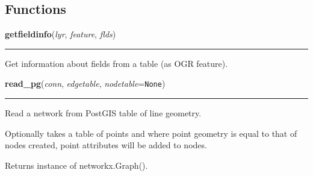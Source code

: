   \subsection{Functions}

    \label{nx_pg:getfieldinfo}

    \vspace{0.5ex}

\hspace{.8\funcindent}\begin{boxedminipage}{\funcwidth}

    \raggedright \textbf{getfieldinfo}(\textit{lyr}, \textit{feature}, \textit{flds})

    \vspace{-1.5ex}

    \rule{\textwidth}{0.5\fboxrule}
\setlength{\parskip}{2ex}
    Get information about fields from a table (as OGR feature).

\setlength{\parskip}{1ex}
    \end{boxedminipage}

    \label{nx_pg:read_pg}

    \vspace{0.5ex}

\hspace{.8\funcindent}\begin{boxedminipage}{\funcwidth}

    \raggedright \textbf{read\_pg}(\textit{conn}, \textit{edgetable}, \textit{nodetable}={\tt None})

    \vspace{-1.5ex}

    \rule{\textwidth}{0.5\fboxrule}
\setlength{\parskip}{2ex}
    Read a network from PostGIS table of line geometry.

    Optionally takes a table of points and where point geometry is equal to
    that of nodes created, point attributes will be added to nodes.

    Returns instance of networkx.Graph().

\setlength{\parskip}{1ex}
    \end{boxedminipage}

    \label{nx_pg:netgeometry}

    \vspace{0.5ex}

